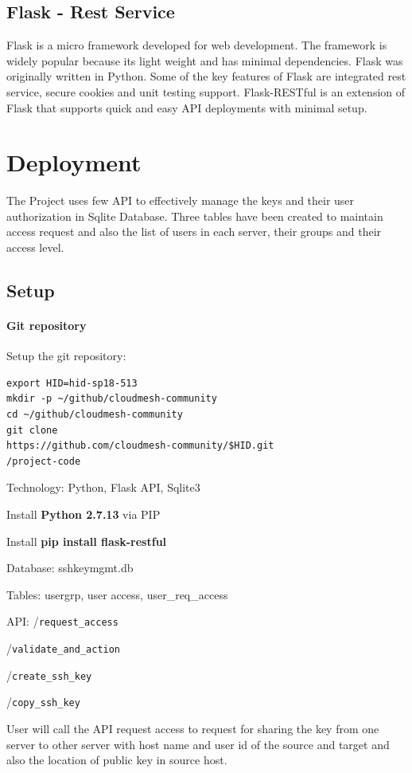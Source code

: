 \subsection{Flask - Rest Service}
Flask is a micro framework developed for web development. The 
framework is widely popular because its light weight and has 
minimal dependencies. Flask was originally written in Python. 
Some of the key features of Flask are integrated rest service,
secure cookies and unit testing support. Flask-RESTful is an
extension of Flask that supports quick and easy API
deployments with minimal setup. 

\section{Deployment}
The Project uses few API to effectively manage the keys and their
user authorization in Sqlite Database.
Three tables have been created to maintain access request and also
the list of users in each server, their groups and their access level.

\subsection{Setup}
\paragraph{Git repository}
Setup the git repository:
\begin{verbatim}
export HID=hid-sp18-513 
mkdir -p ~/github/cloudmesh-community
cd ~/github/cloudmesh-community 
git clone
https://github.com/cloudmesh-community/$HID.git
/project-code
\end{verbatim}

Technology: Python, Flask API, Sqlite3

Install \textbf{Python 2.7.13} via PIP

Install \textbf{pip install flask-restful} 

Database: sshkeymgmt.db 

Tables: usergrp, user access, user\_req\_access 

API: 
    /\verb|request_access|

    /\verb|validate_and_action|

    /\verb|create_ssh_key|

    /\verb|copy_ssh_key|

User will call the API request access to request for sharing 
the key from one server to other server with host name and 
user id of the source and target and also the location of 
public key in source host.

